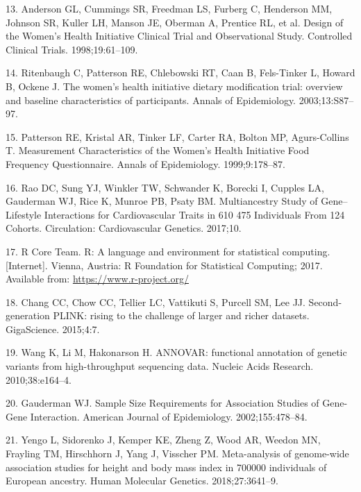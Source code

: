 \documentclass[]{article}
\begin{document}
\leavevmode\hypertarget{ref-Anderson1998}{}%
13. Anderson GL, Cummings SR, Freedman LS, Furberg C, Henderson MM,
Johnson SR, Kuller LH, Manson JE, Oberman A, Prentice RL, et al. Design
of the Women's Health Initiative Clinical Trial and Observational Study.
Controlled Clinical Trials. 1998;19:61--109.

\leavevmode\hypertarget{ref-Ritenbaugh2003}{}%
14. Ritenbaugh C, Patterson RE, Chlebowski RT, Caan B, Fels-Tinker L,
Howard B, Ockene J. The women's health initiative dietary modification
trial: overview and baseline characteristics of participants. Annals of
Epidemiology. 2003;13:S87--97.

\leavevmode\hypertarget{ref-Patterson1999}{}%
15. Patterson RE, Kristal AR, Tinker LF, Carter RA, Bolton MP,
Agurs-Collins T. Measurement Characteristics of the Women's Health
Initiative Food Frequency Questionnaire. Annals of Epidemiology.
1999;9:178--87.

\leavevmode\hypertarget{ref-Rao2017}{}%
16. Rao DC, Sung YJ, Winkler TW, Schwander K, Borecki I, Cupples LA,
Gauderman WJ, Rice K, Munroe PB, Psaty BM. Multiancestry Study of
Gene--Lifestyle Interactions for Cardiovascular Traits in 610 475
Individuals From 124 Cohorts. Circulation: Cardiovascular Genetics.
2017;10.

\leavevmode\hypertarget{ref-RCoreTeam2017}{}%
17. R Core Team. R: A language and environment for statistical
computing. {[}Internet{]}. Vienna, Austria: R Foundation for Statistical
Computing; 2017. Available from: \url{https://www.r-project.org/}

\leavevmode\hypertarget{ref-Chang2015}{}%
18. Chang CC, Chow CC, Tellier LC, Vattikuti S, Purcell SM, Lee JJ.
Second-generation PLINK: rising to the challenge of larger and richer
datasets. GigaScience. 2015;4:7.

\leavevmode\hypertarget{ref-Wang2010}{}%
19. Wang K, Li M, Hakonarson H. ANNOVAR: functional annotation of
genetic variants from high-throughput sequencing data. Nucleic Acids
Research. 2010;38:e164--4.

\leavevmode\hypertarget{ref-Gauderman2002}{}%
20. Gauderman WJ. Sample Size Requirements for Association Studies of
Gene-Gene Interaction. American Journal of Epidemiology.
2002;155:478--84.

\leavevmode\hypertarget{ref-Yengo2018}{}%
21. Yengo L, Sidorenko J, Kemper KE, Zheng Z, Wood AR, Weedon MN,
Frayling TM, Hirschhorn J, Yang J, Visscher PM. Meta-analysis of
genome-wide association studies for height and body mass index in 700000
individuals of European ancestry. Human Molecular Genetics.
2018;27:3641--9.
\end{document}
